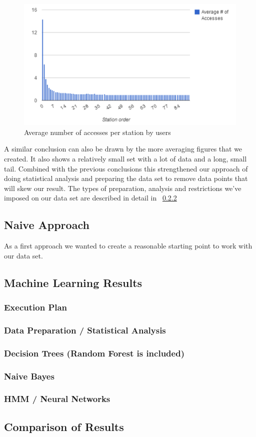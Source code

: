 \begin{figure}[!ht]
	\caption{Average number of accesses per station by users}
	\centering
	\includegraphics[width=1.0\textwidth]{charts/number_stations_average_user}
\end{figure}

A similar conclusion can also be drawn by the more averaging figures that we created. It also shows a relatively small set with a lot of data and a long, small tail. Combined with the previous conclusions this strengthened our approach of doing statistical analysis and preparing the data set to remove data points that will skew our result. The types of preparation, analysis and restrictions we've imposed on our data set are described in detail in ~\ref{subsubsec:data_preparation}

\subsection{Naive Approach}
As a first approach we wanted to create a reasonable starting point to work with our data set. 


\subsection{Machine Learning Results}
\label{subsec:machine_learning_results}

\subsubsection{Execution Plan}
\subsubsection{Data Preparation / Statistical Analysis}
\label{subsubsec:data_preparation}
\subsubsection{Decision Trees (Random Forest is included)}
\subsubsection{Naive Bayes}
\subsubsection{HMM / Neural Networks}

\subsection{Comparison of Results}